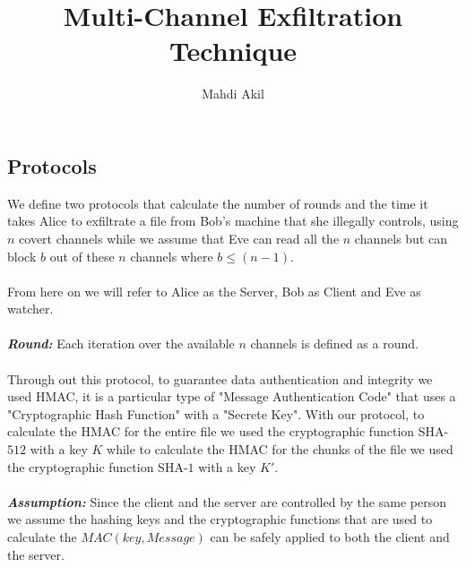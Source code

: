 \documentclass[main.tex]{subfiles}
\title{Multi-Channel Exfiltration Technique}
\author{Mahdi Akil}
\date{}                                           %
\begin{document}
\begin{center}\section{Protocols}\end{center}
We define two protocols that calculate the number of rounds and the time it takes Alice to exfiltrate a file from Bob's machine that she illegally controls, using $n$ covert channels while we assume that Eve can read all the $n$ channels but can block $b$ out of these $n$ channels where $b \leq (n-1)$.\\
\paragraph{}
From here on we will refer to Alice as the Server, Bob as Client and Eve as watcher.\paragraph{}
\textbf{\textit{Round:}} Each iteration over the available $n$ channels is defined as a round.
\paragraph{}
Through out this protocol, to guarantee data authentication and integrity we used HMAC, it is a particular type of "Message Authentication Code" that uses a "Cryptographic Hash Function" with a "Secrete Key". With our protocol, to calculate the HMAC for the entire file we used the cryptographic function SHA-$512$ with a key $K$ while to calculate the HMAC for the chunks of the file we used the cryptographic function SHA-$1$ with a key $K'$.\\
\paragraph{}
\textbf{\textit{Assumption:}} Since the client and the server are controlled by the same person we assume the hashing keys and the cryptographic functions that are used to calculate the $MAC(key,Message)$ can be safely applied to both the client and the server.
\end{document}
